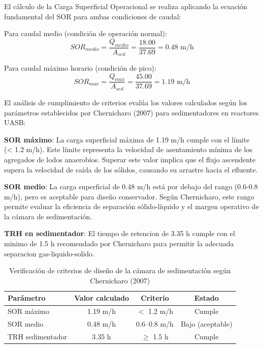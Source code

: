\documentclass[12pt,a4paper]{article}
\begin{document}
El cálculo de la Carga Superficial Operacional se realiza aplicando la ecuación fundamental del SOR para ambas condiciones de caudal:

Para caudal medio (condición de operación normal):
\begin{equation}
SOR_{medio} = \frac{Q_{medio}}{A_{sed}} = \frac{18.00}{37.69} = 0.48 \text{ m/h}
\end{equation}

Para caudal máximo horario (condición de pico):
\begin{equation}
SOR_{max} = \frac{Q_{max}}{A_{sed}} = \frac{45.00}{37.69} = 1.19 \text{ m/h}
\end{equation}

El análisis de cumplimiento de criterios evalúa los valores calculados según los parámetros establecidos por Chernicharo (2007) para sedimentadores en reactores UASB:


     \textbf{SOR máximo}: La carga superficial máxima de 1.19 m/h cumple con el límite (< 1.2 m/h). Este límite representa la velocidad de asentamiento mínima de los agregados de lodos anaerobios. Superar este valor implica que el flujo ascendente supera la velocidad de caída de los sólidos, causando su arrastre hacia el efluente.
    
     \textbf{SOR medio}: La carga superficial de 0.48 m/h está por debajo del rango (0.6-0.8 m/h), pero es aceptable para diseño conservador. Según Chernicharo, este rango permite evaluar la eficiencia de separación sólido-líquido y el margen operativo de la cámara de sedimentación.
    
     \textbf{TRH en sedimentador}: El tiempo de retencion de 3.35 h cumple con el minimo de 1.5 h recomendado por Chernicharo para permitir la adecuada separacion gas-liquido-solido.


\begin{table}[H]
\centering
\caption{Verificación de criterios de diseño de la cámara de sedimentación según Chernicharo (2007)}
\begin{tabular}{lccc}
\toprule
\textbf{Parámetro} & \textbf{Valor calculado} & \textbf{Criterio} & \textbf{Estado} \\
\midrule
SOR máximo & 1.19 m/h & $<$ 1.2 m/h & Cumple \\
SOR medio & 0.48 m/h & 0.6--0.8 m/h & Bajo (aceptable) \\
TRH sedimentador & 3.35 h & $\geq$ 1.5 h & Cumple \\
\bottomrule
\end{tabular}
\end{table}
\end{document}
